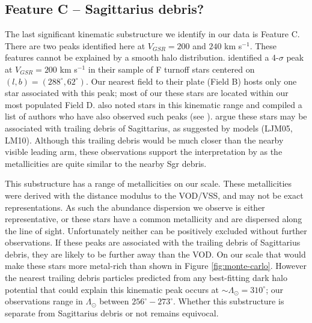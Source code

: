 \documentclass[preprint2]{aastex}
\begin{document}

	\subsection{Feature C \--- Sagittarius debris?}
	\label{sec:feature-c}

	The last significant kinematic substructure we identify in our data is Feature C. There are two peaks identified here at $V_{GSR} = 200$ and $240$ km s$^{-1}$. These features cannot be explained by a smooth halo distribution. \citet{Newberg;et-al_2007} identified a 4-$\sigma$ peak at $V_{GSR} = 200$ km s$^{-1}$ in their sample of F turnoff stars centered on $(l, b) = (288^\circ, 62^\circ)$. Our nearest field to their plate (Field B) hosts only one star associated with this peak; most of our these stars are located within our most populated Field D. \citet{Prior;et-al_2009b} also noted stars in this kinematic range and compiled a list of authors who have also observed such peaks (see \citet{Sirko;et-al_2004, Duffau;et-al_2006, Starkenburg;et-al_2009}). \citet{Prior;et-al_2009b} argue these stars may be associated with trailing debris of Sagittarius, as suggested by models (LJM05, LM10).  Although this trailing debris would be much closer than the nearby visible leading arm, these observations support the interpretation by \citet{Prior;et-al_2009b} as the metallicities are quite similar to the nearby Sgr debris.
	
 
	This substructure has a range of metallicities on our scale. These metallicities were derived with the distance modulus to the VOD/VSS, and may not be exact representations. As such the abundance dispersion we observe is either representative, or these stars have a common metallicity and are dispersed along the line of sight. Unfortunately neither can be positively excluded without further observations. If these peaks are associated with the trailing debris of Sagittarius debris, they are likely to be further away than the VOD. On our scale that would make these stars more metal-rich than shown in Figure \ref{fig:monte-carlo}. However the nearest trailing debris particles predicted from any best-fitting dark halo potential that could explain this kinematic peak occurs at $\sim\Lambda_\odot = 310^\circ$; our observations range in $\Lambda_\odot$ between $256^\circ-273^\circ$. Whether this substructure is separate from Sagittarius debris or not remains equivocal.	
	
\end{document}
